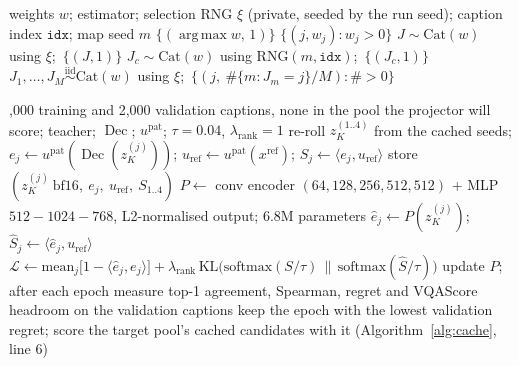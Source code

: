 \documentclass[11pt,a4paper]{article}
\DeclareMathOperator*{\argmax}{arg\,max}
\DeclareMathOperator{\Dec}{Dec}
\begin{document}
\begin{algorithm}[H]
\caption{\textsc{Estimator}: which candidates this update trains on, and with what weight}
\label{alg:estimator}
\begin{algorithmic}[1]
\Require weights $w$; estimator; selection RNG $\xi$ (private, seeded by the run seed); caption index $\texttt{idx}$; map seed $m$
 \Return $\{(\argmax w,\,1)\}$ 
 \Return $\{(j,w_j):w_j>0\}$ 
 $J\sim\mathrm{Cat}(w)$ using $\xi$;\ \Return $\{(J,1)\}$ 
 $J_c\sim\mathrm{Cat}(w)$ using $\mathrm{RNG}(m,\texttt{idx})$;\ \Return $\{(J_c,1)\}$ 
 $J_1,\dots,J_M\overset{\mathrm{iid}}{\sim}\mathrm{Cat}(w)$ using $\xi$;\ \Return $\{(j,\ \#\{m:J_m=j\}/M):\#>0\}$
\EndIf
\end{algorithmic}
\end{algorithm}

\begin{algorithm}[H]
\caption{Latent projector training (once, offline)}
\label{alg:projector}
\begin{algorithmic}[1]
,000 training and 2,000 validation captions, none in the pool the projector will score; teacher; $\Dec$; $u^{\mathrm{pat}}$; $\tau=0.04$, $\lambda_{\mathrm{rank}}=1$
 
  \State re-roll $z^{(1..4)}_K$ from the cached seeds; $e_j\gets u^{\mathrm{pat}}(\Dec(z^{(j)}_K))$; $u_{\mathrm{ref}}\gets u^{\mathrm{pat}}(x^{\mathrm{ref}})$; $S_j\gets\langle e_j,u_{\mathrm{ref}}\rangle$
  \State store $(z^{(j)}_K\ \text{bf16},\ e_j,\ u_{\mathrm{ref}},\ S_{1..4})$ 
\EndFor
\State $P\gets$ conv encoder $(64,128,256,512,512)$ + MLP $512{-}1024{-}768$, L2-normalised output; 6.8M parameters
 
  \State $\hat e_j\gets P(z^{(j)}_K)$;\quad $\hat S_j\gets\langle\hat e_j,u_{\mathrm{ref}}\rangle$
  \State $\mathcal{L}\gets\mathrm{mean}_j\big[1-\langle\hat e_j,e_j\rangle\big]+\lambda_{\mathrm{rank}}\,\mathrm{KL}\big(\mathrm{softmax}(S/\tau)\,\|\,\mathrm{softmax}(\hat S/\tau)\big)$
  \State update $P$; after each epoch measure top-1 agreement, Spearman, regret and VQAScore headroom on the validation captions
\EndFor
\State keep the epoch with the lowest validation regret; score the target pool's cached candidates with it (Algorithm~\ref{alg:cache}, line 6)
\end{algorithmic}
\end{algorithm}
\end{document}
